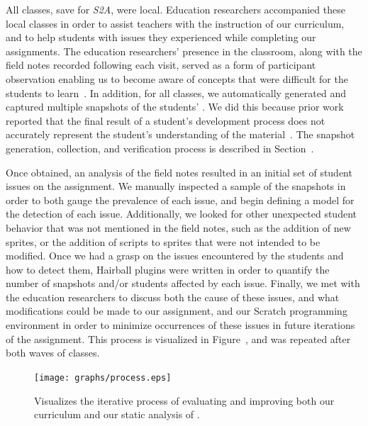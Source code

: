 All classes, save for \emph{S2A}, were local. Education researchers accompanied
these local classes in order to assist teachers with the instruction of our
curriculum, and to help students with issues they experienced while completing
our assignments. The education researchers' presence in the classroom, along
with the field notes recorded following each visit, served as a form of
participant observation enabling us to become aware of concepts that were
difficult for the students to learn~\cite{spradley80}. In addition, for all
classes, we automatically generated and captured multiple snapshots of the
students' . We did this because prior work reported that the final
result of a student's development process does not accurately represent the
student's understanding of the
material~\cite{Piech:2012:MSL:2157136.2157182,brennan12}. The snapshot
generation, collection, and verification process is described in
Section~.

Once obtained, an analysis of the field notes resulted in an initial set of
student issues on the assignment. We manually inspected a sample of the
snapshots in order to both gauge the prevalence of each issue, and begin
defining a model for the detection of each issue. Additionally, we looked for
other unexpected student behavior that was not mentioned in the field notes,
such as the addition of new sprites, or the addition of scripts to sprites that
were not intended to be modified. Once we had a grasp on the issues encountered
by the students and how to detect them, Hairball plugins were written in order
to quantify the number of snapshots and/or students affected by each
issue. Finally, we met with the education researchers to discuss both the cause
of these issues, and what modifications could be made to our assignment, and
our Scratch programming environment in order to minimize occurrences of these
issues in future iterations of the assignment. This process is visualized in
Figure~, and was repeated after both waves of classes.

\begin{figure}[!t]
\centering
\texttt{[image: graphs/process.eps]}
\caption{Visualizes the iterative process of evaluating and improving both our
  curriculum and our static analysis of .}
\end{figure}

